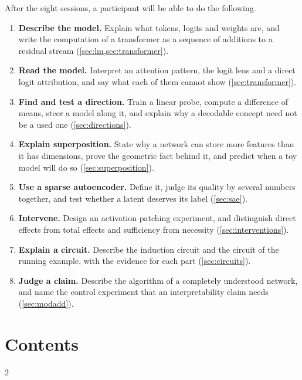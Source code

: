 \documentclass[11pt,a4paper]{article}
\theoremstyle{plain}
\theoremstyle{definition}
\theoremstyle{remark}
\begin{document}
After the eight sessions, a participant will be able to do the following.
\begin{enumerate}[leftmargin=2em, itemsep=2pt]
\item \textbf{Describe the model.} Explain what tokens, logits and weights are, and write the computation of a
transformer as a sequence of additions to a residual stream (\cref{sec:lm,sec:transformer}).
\item \textbf{Read the model.} Interpret an attention pattern, the logit lens and a direct logit attribution, and
say what each of them cannot show (\cref{sec:transformer}).
\item \textbf{Find and test a direction.} Train a linear probe, compute a difference of means, steer a model along
it, and explain why a decodable concept need not be a used one (\cref{sec:directions}).
\item \textbf{Explain superposition.} State why a network can store more features than it has dimensions, prove
the geometric fact behind it, and predict when a toy model will do so (\cref{sec:superposition}).
\item \textbf{Use a sparse autoencoder.} Define it, judge its quality by several numbers together, and test whether
a latent deserves its label (\cref{sec:sae}).
\item \textbf{Intervene.} Design an activation patching experiment, and distinguish direct effects from total effects and
sufficiency from necessity (\cref{sec:interventions}).
\item \textbf{Explain a circuit.} Describe the induction circuit and the circuit of the running example, with the
evidence for each part (\cref{sec:circuits}).
\item \textbf{Judge a claim.} Describe the algorithm of a completely understood network, and name the control
experiment that an interpretability claim needs (\cref{sec:modadd}).
\end{enumerate}

\section*{Contents}
\vspace{-0.5em}
{\footnotesize \setlength{\parskip}{0pt} \setlength{\columnsep}{22pt}
\begin{multicols}{2}
\makeatletter{}\makeatother
\end{multicols}}
\clearpage










\appendix


{\footnotesize \setlength{\bibsep}{2.5pt plus 1pt}


}
\end{document}
